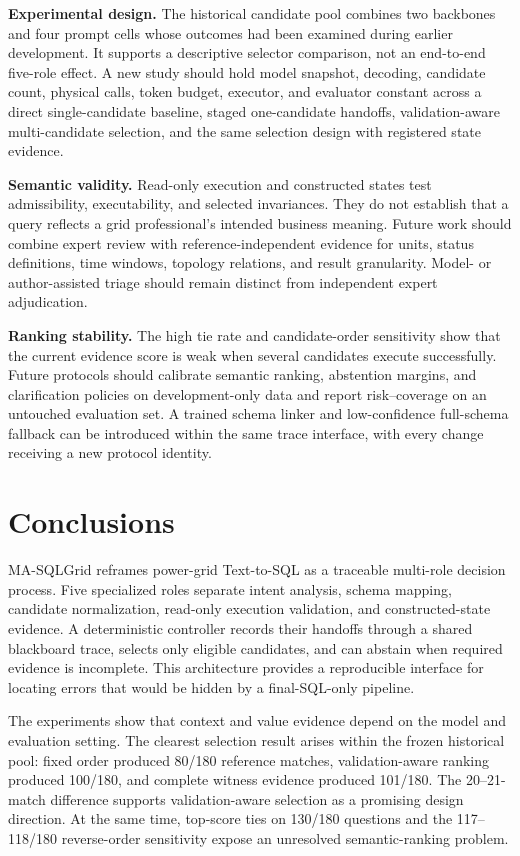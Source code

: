 \documentclass[applsci,article,submit,moreauthors]{Definitions/mdpi}
\newcommand{\masql}{MA-SQLGrid}
\begin{document}
\textbf{Experimental design.} The historical candidate pool combines two backbones and four prompt cells whose outcomes had been examined during earlier development. It supports a descriptive selector comparison, not an end-to-end five-role effect. A new study should hold model snapshot, decoding, candidate count, physical calls, token budget, executor, and evaluator constant across a direct single-candidate baseline, staged one-candidate handoffs, validation-aware multi-candidate selection, and the same selection design with registered state evidence.

\textbf{Semantic validity.} Read-only execution and constructed states test admissibility, executability, and selected invariances. They do not establish that a query reflects a grid professional's intended business meaning. Future work should combine expert review with reference-independent evidence for units, status definitions, time windows, topology relations, and result granularity. Model- or author-assisted triage should remain distinct from independent expert adjudication.

\textbf{Ranking stability.} The high tie rate and candidate-order sensitivity show that the current evidence score is weak when several candidates execute successfully. Future protocols should calibrate semantic ranking, abstention margins, and clarification policies on development-only data and report risk--coverage on an untouched evaluation set. A trained schema linker and low-confidence full-schema fallback can be introduced within the same trace interface, with every change receiving a new protocol identity.

\section{Conclusions}

\masql{} reframes power-grid Text-to-SQL as a traceable multi-role decision process. Five specialized roles separate intent analysis, schema mapping, candidate normalization, read-only execution validation, and constructed-state evidence. A deterministic controller records their handoffs through a shared blackboard trace, selects only eligible candidates, and can abstain when required evidence is incomplete. This architecture provides a reproducible interface for locating errors that would be hidden by a final-SQL-only pipeline.

The experiments show that context and value evidence depend on the model and evaluation setting. The clearest selection result arises within the frozen historical pool: fixed order produced 80/180 reference matches, validation-aware ranking produced 100/180, and complete witness evidence produced 101/180. The 20--21-match difference supports validation-aware selection as a promising design direction. At the same time, top-score ties on 130/180 questions and the 117--118/180 reverse-order sensitivity expose an unresolved semantic-ranking problem.
\end{document}
